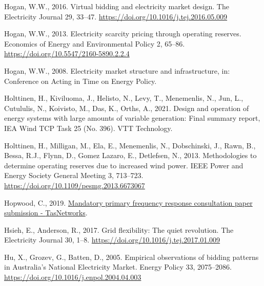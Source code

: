 \documentclass[12pt,a4paper,]{report}
\newlength{\cslhangindent}
\newenvironment{CSLReferences}[2] %
 {%
  \setlength{\parindent}{0pt}
  \ifodd #1 \everypar{\setlength{\hangindent}{\cslhangindent}}\ignorespaces\fi
  \ifnum #2 > 0
  \setlength{\parskip}{#2\baselineskip}
  \fi
 }%
 {}
\begin{document}
\begin{CSLReferences}{1}{0}
\leavevmode{}%
Hogan, W.W., 2016. Virtual bidding and electricity market design. The
Electricity Journal 29, 33--47.
\url{https://doi.org/10.1016/j.tej.2016.05.009}

\leavevmode{}%
Hogan, W.W., 2013. Electricity scarcity pricing through operating
reserves. Economics of Energy and Environmental Policy 2, 65--86.
\url{https://doi.org/10.5547/2160-5890.2.2.4}

\leavevmode{}%
Hogan, W.W., 2008. Electricity market structure and infrastructure, in:
Conference on {Acting} in {Time} on {Energy Policy}.

\leavevmode{}%
Holttinen, H., Kiviluoma, J., Helisto, N., Levy, T., Menemenlis, N.,
Jun, L., Cutululis, N., Koivisto, M., Das, K., Orths, A., 2021. Design
and operation of energy systems with large amounts of variable
generation: {Final} summary report, {IEA Wind TCP Task} 25 (No. 396).
{VTT Technology}.

\leavevmode{}%
Holttinen, H., Milligan, M., Ela, E., Menemenlis, N., Dobschinski, J.,
Rawn, B., Bessa, R.J., Flynn, D., Gomez Lazaro, E., Detlefsen, N., 2013.
Methodologies to determine operating reserves due to increased wind
power. IEEE Power and Energy Society General Meeting 3, 713--723.
\url{https://doi.org/10.1109/pesmg.2013.6673067}

\leavevmode{}%
Hopwood, C., 2019.
\href{https://www.aemc.gov.au/sites/default/files/2019-11/Rule\%20Change\%20SubmissionERC0274\%20-\%20TasNetworks\%20-\%2020191031.PDF}{Mandatory
primary frequency response consultation paper submission -
{TasNetworks}}.

\leavevmode{}%
Hsieh, E., Anderson, R., 2017. Grid flexibility: {The} quiet revolution.
The Electricity Journal 30, 1--8.
\url{https://doi.org/10.1016/j.tej.2017.01.009}

\leavevmode{}%
Hu, X., Grozev, G., Batten, D., 2005. Empirical observations of bidding
patterns in {Australia}'s {National Electricity Market}. Energy Policy
33, 2075--2086. \url{https://doi.org/10.1016/j.enpol.2004.04.003}


\end{CSLReferences}
\end{document}
